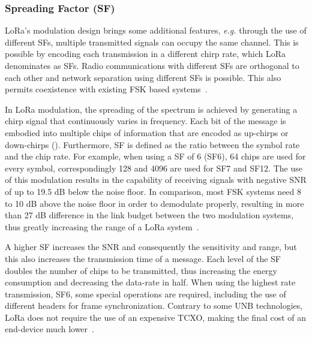 \subsubsection{Spreading Factor (SF)}
\ac{LoRa}'s modulation design brings some additional features, \emph{e.g.} through the use of different \acp{SF}, multiple transmitted signals can occupy the same channel.
This is possible by encoding each transmission in a different chirp rate,
which LoRa denominates as \acp{SF}. Radio communications with different
\acp{SF} are orthogonal to each other and network separation using different
\acp{SF} is possible. This also permits coexistence with existing \ac{FSK}
based systems~\cite{Bor,LoRaWANSpec}.

In \ac{LoRa} modulation, the spreading of the spectrum is achieved by
generating a chirp signal that continuously varies in frequency. Each bit of
the message is embodied into multiple chips of information that are encoded as
up-chirps or down-chirps (). Furthermore, \ac{SF} is defined
as the ratio between the symbol rate and the chip rate.%
For example, when using a \ac{SF} of 6 (SF6), 64 chips are used for every
symbol, correspondingly 128 and 4096 are used for SF7 and SF12. The use of
this modulation results in the capability of receiving signals with negative
\ac{SNR} of up to 19.5 dB below the noise floor. In comparison, most \ac{FSK}
systems need 8 to 10 dB above the noise floor in order to demodulate properly,
resulting in more than 27 dB difference in the link budget between the two
modulation systems, thus greatly increasing the range of a \ac{LoRa}
system~\cite{SX1276,SX1301}.

A higher \ac{SF} increases the \ac{SNR} and consequently the sensitivity and
range, but this also increases the transmission time of a message. Each level
of the \ac{SF} doubles the number of chips to be transmitted, thus increasing
the energy consumption and decreasing the data-rate in half. When using the
highest rate transmission, SF6, some special operations are required,
including the use of different headers for frame synchronization. Contrary to
some \ac{UNB} technologies, \ac{LoRa} does not require the use of an expensive
\ac{TCXO}, making the final cost of an end-device much lower~\cite{SX1276}.%


